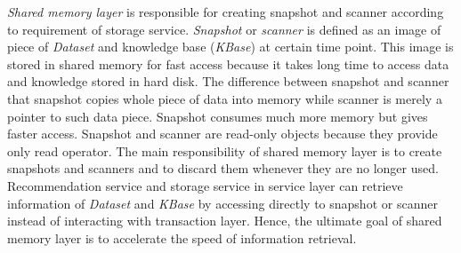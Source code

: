 \documentclass[a4paper]{llncs}
\begin{document}
\textit{Shared memory layer} is responsible for creating snapshot and scanner according to requirement of storage service. \textit{Snapshot} or \textit{scanner} is defined as an image of piece of \textit{Dataset} and knowledge base (\textit{KBase}) at certain time point. This image is stored in shared memory for fast access because it takes long time to access data and knowledge stored in hard disk. The difference between snapshot and scanner that snapshot copies whole piece of data into memory while scanner is merely a pointer to such data piece. Snapshot consumes much more memory but gives faster access. Snapshot and scanner are read-only objects because they provide only read operator. The main responsibility of shared memory layer is to create snapshots and scanners and to discard them whenever they are no longer used. Recommendation service and storage service in service layer can retrieve information of \textit{Dataset} and \textit{KBase} by accessing directly to snapshot or scanner instead of interacting with transaction layer. Hence, the ultimate goal of shared memory layer is to accelerate the speed of information retrieval.
\end{document}
